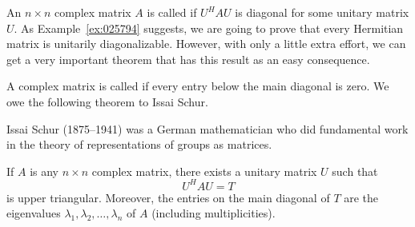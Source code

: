 \documentclass{ximera}
\begin{document}
An $n \times n$ complex matrix $A$ is called  if $U^{H}AU$ is diagonal for some unitary matrix $U$. As Example~\ref{ex:025794} suggests, we are going to prove that every Hermitian matrix is unitarily diagonalizable. However, with only a little extra effort, we can get a very important theorem that has this result as an easy consequence.

A complex matrix is called  if every entry below the main diagonal is zero. We owe the following theorem to Issai Schur.

\begin{remark}
Issai
 Schur (1875--1941) was a German mathematician who did fundamental work
in the theory of representations of groups as matrices.
\end{remark} 

\begin{theorem}\label{th:025814}
If $A$ is any $n \times n$ complex matrix, there exists a unitary matrix $U$ such that
\begin{equation*}
U^HAU = T
\end{equation*}
is upper triangular. Moreover, the entries on the main diagonal of $T$ are the eigenvalues $\lambda_{1}, \lambda_{2}, \ldots, \lambda_{n}$ of $A$ (including multiplicities).
\end{theorem}
\end{document}
